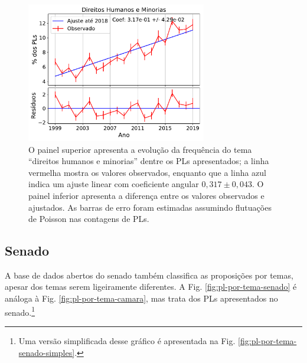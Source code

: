 \documentclass[12pt,a4paper]{article}
\begin{document}
\begin{figure}[H]
\centering
\includegraphics[width=0.7\textwidth]{graficos/PL-direitos-humanos-por-ano_2019-05-01.pdf}
\caption{O painel superior apresenta a evolução da frequência do tema ``direitos humanos e minorias''
  dentre os PLs apresentados; a linha vermelha mostra os valores observados, enquanto que a linha
  azul indica um ajuste linear com coeficiente angular $0,317\pm 0,043$. O painel inferior apresenta
  a diferença entre os valores observados e ajustados. As barras de erro foram estimadas assumindo
  flutuações de Poisson nas contagens de PLs.}
\label{fig:pl-direitos-humanos}
\end{figure}

\subsection{Senado}

A base de dados abertos do senado também classifica as proposições por temas, apesar dos temas serem
ligeiramente diferentes. A Fig. \ref{fig:pl-por-tema-senado} é análoga à Fig. \ref{fig:pl-por-tema-camara}, mas trata dos PLs apresentados
no senado.\footnote{Uma versão simplificada desse gráfico é apresentada na Fig. \ref{fig:pl-por-tema-senado-simples}.}
\end{document}
